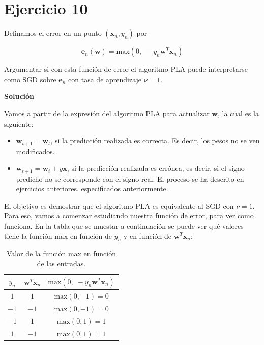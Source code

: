 \documentclass[11pt,a4paper]{article}
\newcommand{\answer}{\noindent\textbf{Solución}}
\newcommand{\maximum}{\text{max}}
\begin{document}
\section*{Ejercicio 10}

\noindent Definamos el error en un punto $(\mathbf{x}_n, y_n)$ por

\[\mathbf{e}_n(\mathbf{w}) = \maximum(0, \; -y_n\mathbf{w}^T\mathbf{x}_n)\] 

\noindent Argumentar si con esta función de error el algoritmo PLA puede interpretarse como SGD sobre $\mathbf{e}_n$ con tasa
de aprendizaje $\nu = 1$.

\answer

Vamos a partir de la expresión del algoritmo PLA para actualizar $\mathbf{w}$, la cual es la siguiente:

\begin{itemize}
	\item $\mathbf{w}_{t+1} = \mathbf{w}_{t}$, si la predicción realizada es correcta. Es decir, los pesos no se ven
	modificados.
	\item $\mathbf{w}_{t+1} = \mathbf{w}_{t} + y\mathbf{x}$, si la predicción realizada es errónea, es decir, si el signo
	predicho no se corresponde con el signo real. El proceso se ha descrito en ejercicios anteriores.
	especificados anteriormente.
\end{itemize}

El objetivo es demostrar que el algoritmo PLA es equivalente al SGD con $\nu = 1$. Para eso, vamos a comenzar estudiando
nuestra función de error, para ver como funciona. En la tabla que se muestar a continuación se puede ver qué valores
tiene la función $\maximum$ en función de $y_n$ y en función de $\mathbf{w}^T\mathbf{x}_n$:

\begin{table}[H]
\centering
\begin{tabular}{c|c|c}
	$y_n$ & $\mathbf{w}^T\mathbf{x}_n$ & $\maximum(0, \; -y_n\mathbf{w}^T\mathbf{x}_n)$ \\ \hline
	$1$  & $1$		   & $\maximum(0, -1) = 0$ \\
	$-1$ & $-1$        & $\maximum(0, -1) = 0$  \\
	$-1$ & $1$         & $\maximum(0, 1) = 1$   \\
	$1$  & $-1$        & $\maximum(0, 1) = 1$                  
\end{tabular}
\caption{Valor de la función max en función de las entradas.}
\end{table}
\end{document}
